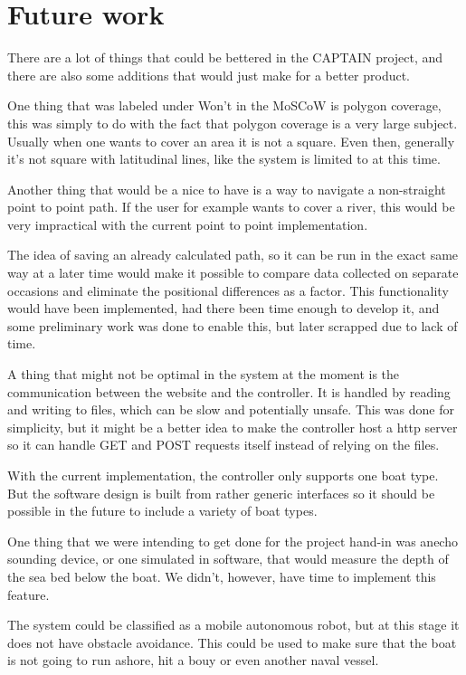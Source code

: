 \newpage
\chapter{Future work}
There are a lot of things that could be bettered in the CAPTAIN project, and there are also some additions that would just make for a better product.

One thing that was labeled under Won't in the MoSCoW is polygon coverage, this was simply to do with the fact that polygon coverage is a very large subject. Usually when one wants to cover an area it is not a square. Even then, generally it's not square with latitudinal lines, like the system is limited to at this time. 

Another thing that would be a nice to have is a way to navigate a non-straight point to point path. If the user for example wants to cover a river, this would be very impractical with the current point to point implementation. 

The idea of saving an already calculated path, so it can be run in the exact same way at a later time would make it possible to compare data collected on separate occasions and eliminate the positional differences as a factor. This functionality would have been implemented, had there been time enough to develop it, and some preliminary work was done to enable this, but later scrapped due to lack of time.

A thing that might not be optimal in the system at the moment is the communication between the website and the controller. It is handled by reading and writing to files, which can be slow and potentially unsafe. This was done for simplicity, but it might be a better idea to make the controller host a http server so it can handle GET and POST requests itself instead of relying on the files.  

With the current implementation, the controller only supports one boat type. But the software design is built from rather generic interfaces so it should be possible in the future to include a variety of boat types.

One thing that we were intending to get done for the project hand-in was anecho sounding device, or one simulated in software, that would measure the depth of the sea bed below the boat. We didn't, however, have time to implement this feature.

The system could be classified as a mobile autonomous robot, but at this stage it does not have obstacle avoidance. This could be used to make sure that the boat is not going to run ashore, hit a bouy or even another naval vessel. 

